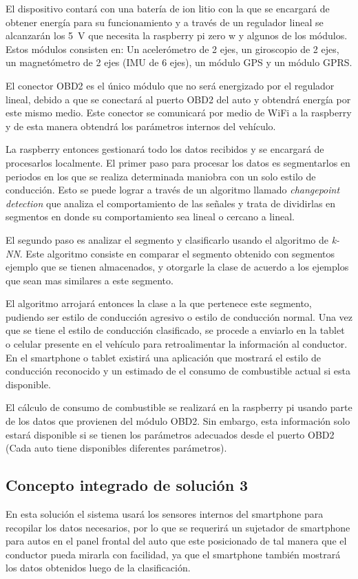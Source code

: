 El dispositivo contará con una batería de ion litio con la que se encargará de obtener energía para su funcionamiento y a través de un regulador lineal se alcanzarán los \SI{5}{V} que necesita la raspberry pi zero w y algunos de los módulos. Estos módulos consisten en: Un acelerómetro de 2 ejes, un giroscopio de 2 ejes, un magnetómetro de 2 ejes (IMU de 6 ejes), un módulo GPS y un módulo GPRS.

El conector OBD2 es el único módulo que no será energizado por el regulador lineal, debido a que se conectará al puerto OBD2 del auto y obtendrá energía por este mismo medio. Este conector se comunicará por medio de WiFi a la raspberry y de esta manera obtendrá los parámetros internos del vehículo.

La raspberry entonces gestionará todo los datos recibidos y se encargará de procesarlos localmente. El primer paso para procesar los datos es segmentarlos en periodos en los que se realiza determinada maniobra con un solo estilo de conducción. Esto se puede lograr a través de un algoritmo llamado {\it changepoint detection} que analiza el comportamiento de las señales y trata de dividirlas en segmentos en donde su comportamiento sea lineal o cercano a lineal.

El segundo paso es analizar el segmento y clasificarlo usando el algoritmo de {\it k-NN}. Este algoritmo consiste en comparar el segmento obtenido con segmentos ejemplo que se tienen almacenados, y otorgarle la clase de acuerdo a los ejemplos que sean mas similares a este segmento.

El algoritmo arrojará entonces la clase a la que pertenece este segmento, pudiendo ser estilo de conducción agresivo o estilo de conducción normal. Una vez que se tiene el estilo de conducción clasificado, se procede a enviarlo en la tablet o celular presente en el vehículo para retroalimentar la información al conductor. En el smartphone o tablet existirá una aplicación que mostrará el estilo de conducción reconocido y un estimado de el consumo de combustible actual si esta disponible.

El cálculo de consumo de combustible se realizará en la raspberry pi usando parte de los datos que provienen del módulo OBD2. Sin embargo,  esta información solo estará disponible si se tienen los parámetros adecuados desde el puerto OBD2 (Cada auto tiene disponibles diferentes parámetros).

\subsection{Concepto integrado de solución 3}
En esta solución el sistema usará los sensores internos del smartphone para recopilar los datos necesarios, por lo que se requerirá un sujetador de smartphone para autos en el panel frontal del auto que este posicionado de tal manera que el conductor pueda mirarla con facilidad, ya que el smartphone también mostrará los datos obtenidos luego de la clasificación.

